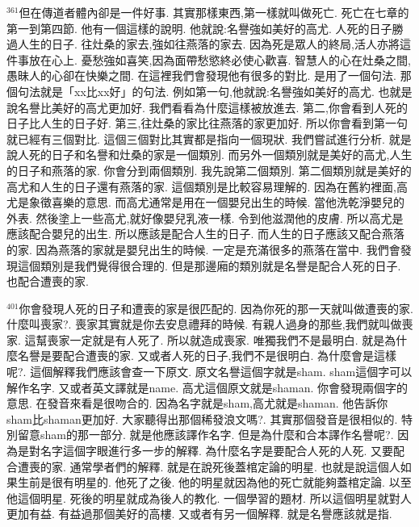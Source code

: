 \documentclass{book}
\begin{document}
$^{361}$但在傳道者體內卻是一件好事.
其實那樣東西,第一樣就叫做死亡.
死亡在七章的第一到第四節.
他有一個這樣的說明.
他就說:名譽強如美好的高尤.
人死的日子勝過人生的日子.
往灶桑的家去,強如往燕落的家去.
因為死是眾人的終局,活人亦將這件事放在心上.
憂愁強如喜笑,因為面帶愁慾終必使心歡喜.
智慧人的心在灶桑之間,愚昧人的心卻在快樂之間.
在這裡我們會發現他有很多的對比.
是用了一個句法.
那個句法就是「xx比xx好」的句法.
例如第一句,他就說:名譽強如美好的高尤.
也就是說名譽比美好的高尤更加好.
我們看看為什麼這樣被放進去.
第二,你會看到人死的日子比人生的日子好.
第三,往灶桑的家比往燕落的家更加好.
所以你會看到第一句就已經有三個對比.
這個三個對比其實都是指向一個現狀.
我們嘗試進行分析.
就是說人死的日子和名譽和灶桑的家是一個類別.
而另外一個類別就是美好的高尤,人生的日子和燕落的家.
你會分到兩個類別.
我先說第二個類別.
第二個類別就是美好的高尤和人生的日子還有燕落的家.
這個類別是比較容易理解的.
因為在舊約裡面,高尤是象徵喜樂的意思.
而高尤通常是用在一個嬰兒出生的時候.
當他洗乾淨嬰兒的外表.
然後塗上一些高尤,就好像嬰兒乳液一樣.
令到他滋潤他的皮膚.
所以高尤是應該配合嬰兒的出生.
所以應該是配合人生的日子.
而人生的日子應該又配合燕落的家.
因為燕落的家就是嬰兒出生的時候.
一定是充滿很多的燕落在當中.
我們會發現這個類別是我們覺得很合理的.
但是那邊廂的類別就是名譽是配合人死的日子.
也配合遭喪的家.

$^{401}$你會發現人死的日子和遭喪的家是很匹配的.
因為你死的那一天就叫做遭喪的家.
什麼叫喪家?.
喪家其實就是你去安息禮拜的時候.
有親人過身的那些,我們就叫做喪家.
這幫喪家一定就是有人死了.
所以就造成喪家.
唯獨我們不是最明白.
就是為什麼名譽是要配合遭喪的家.
又或者人死的日子,我們不是很明白.
為什麼會是這樣呢?.
這個解釋我們應該會查一下原文.
原文名譽這個字就是sham.
sham這個字可以解作名字.
又或者英文譯就是name.
高尤這個原文就是shaman.
你會發現兩個字的意思.
在發音來看是很吻合的.
因為名字就是sham,高尤就是shaman.
他告訴你sham比shaman更加好.
大家聽得出那個稀發浪文嗎?.
其實那個發音是很相似的.
特別留意sham的那一部分.
就是他應該譯作名字.
但是為什麼和合本譯作名譽呢?.
因為是對名字這個字眼進行多一步的解釋.
為什麼名字是要配合人死的人死.
又要配合遭喪的家.
通常學者們的解釋.
就是在說死後蓋棺定論的明星.
也就是說這個人如果生前是很有明星的.
他死了之後.
他的明星就因為他的死亡就能夠蓋棺定論.
以至他這個明星.
死後的明星就成為後人的教化.
一個學習的題材.
所以這個明星就對人更加有益.
有益過那個美好的高樓.
又或者有另一個解釋.
就是名譽應該就是指.
\end{document}
